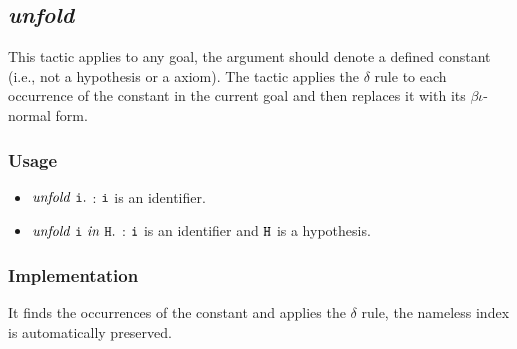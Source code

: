 \subsection{\it unfold}
This tactic applies to any goal, the argument should denote a defined constant (i.e., not a hypothesis or a axiom).
The tactic applies the $\delta$ rule to each occurrence of the constant in the current goal and then replaces it with its $\beta\iota$-normal form.

\subsubsection*{Usage}
\begin{itemize}
\item ${\it unfold}\ \tt i.$ : $\tt i$ is an identifier. 
\item ${\it unfold}\ \tt i\ \it in\ \tt H.$ : $\tt i$ is an identifier and $\tt H$ is a hypothesis.
\end{itemize}

\subsubsection*{Implementation}
It finds the occurrences of the constant and applies the $\delta$ rule, the nameless index is automatically preserved.
